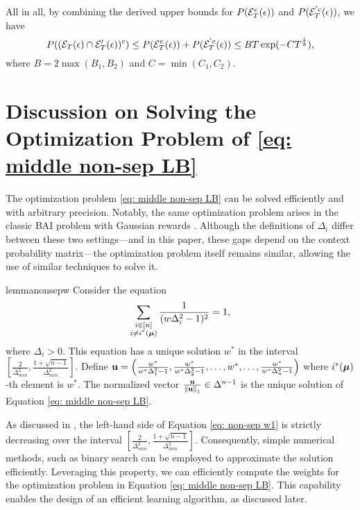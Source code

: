     All in all, by combining the derived upper bounds for $\pr (\E^{c}_T(\epsilon))$ and $\pr(\E^{'c}_T(\epsilon))$, we have
    $$
        \pr((\eteps \cap \etepspr)^c) \leq \pr (\E^{c}_T(\epsilon)) + \pr(\E^{'c}_T(\epsilon)) \leq BT \exp (-CT^{\frac18}),
    $$
    where $B = 2\max (B_1, B_2)$ and $C = \min (C_1, C_2)$.




\section{Discussion on Solving the Optimization Problem of \ref{eq: middle non-sep LB}} \label{apd: opt-solving}

The optimization problem \eqref{eq: middle non-sep LB} can be solved efficiently and with arbitrary precision. Notably, the same optimization problem arises in the classic BAI problem with Gaussian rewards \cite{bai-gaussian-barrier2022non}. Although the definitions of $\Delta_i$ differ between these two settings—and in this paper, these gaps depend on the context probability matrix—the optimization problem itself remains similar, allowing the use of similar techniques to solve it. 
    \begin{restatable}{lemma}{nonsepw} \label{lem: non-sep w1}
        Consider the  equation
        \begin{equation} \label{eq: non-sep w1}
            \sum_{\substack{i \in [n] \\ i \neq \istarmu}} \frac{1}{(w \Delta_i^2 - 1)^2} = 1 , 
        \end{equation}
         where $\Delta_i > 0$. This equation has a unique solution $w^*$ in the interval $\left[\frac{2}{\Delta_{min}^2}, \frac{1 + \sqrt{n-1}}{\Delta_{min}^2}\right]$. Define $\ub = \left(\frac{w^*}{w^*\Delta_1^2 -1}, \frac{w^*}{w^*\Delta_2^2 -1}, \ldots , w^*, \dots, \frac{w^*}{w^*\Delta_n^2 -1}\right)$ where $\istarmu$-th element is $w^*$. The normalized vector $\frac{\ub}{\norm*{\ub}_{1}} \in \Delta^{n-1}$ is the unique solution of Equation \eqref{eq: middle non-sep LB}.
    \end{restatable}

    As discussed in \cite{bai-gaussian-barrier2022non}, the left-hand side of Equation \eqref{eq: non-sep w1} is strictly decreasing over the interval $\left[\frac{2}{\Delta_{min}^2}, \frac{1 + \sqrt{n-1}}{\Delta_{min}^2}\right]$. Consequently, simple numerical methods, such as binary search can be employed to approximate the solution efficiently. Leveraging this property, we can efficiently compute the weights for the optimization problem in Equation \eqref{eq: middle non-sep LB}. This capability enables the design of an efficient learning algorithm, as discussed later.
    



